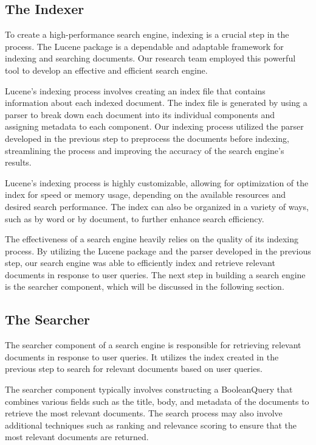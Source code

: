 \subsection{The Indexer}
To create a high-performance search engine, indexing is a crucial step in the process. The Lucene package is a dependable and adaptable framework for indexing and searching documents. Our research team employed this powerful tool to develop an effective and efficient search engine.

Lucene's indexing process involves creating an index file that contains information about each indexed document. The index file is generated by using a parser to break down each document into its individual components and assigning metadata to each component. Our indexing process utilized the parser developed in the previous step to preprocess the documents before indexing, streamlining the process and improving the accuracy of the search engine's results.

Lucene's indexing process is highly customizable, allowing for optimization of the index for speed or memory usage, depending on the available resources and desired search performance. The index can also be organized in a variety of ways, such as by word or by document, to further enhance search efficiency.

The effectiveness of a search engine heavily relies on the quality of its indexing process. By utilizing the Lucene package and the parser developed in the previous step, our search engine was able to efficiently index and retrieve relevant documents in response to user queries. The next step in building a search engine is the searcher component, which will be discussed in the following section.

\subsection{The Searcher}
The searcher component of a search engine is responsible for retrieving relevant documents in response to user queries. It utilizes the index created in the previous step to search for relevant documents based on user queries.

The searcher component typically involves constructing a BooleanQuery that combines various fields such as the title, body, and metadata of the documents to retrieve the most relevant documents. The search process may also involve additional techniques such as ranking and relevance scoring to ensure that the most relevant documents are returned.


